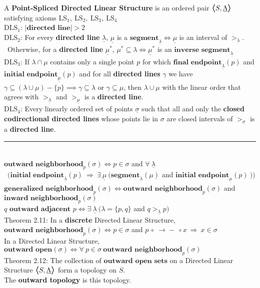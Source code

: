 \documentclass{article}
\newcommand{\hsp}[1][5]{\hspace{0.#1 cm}}
\newcommand{\hcm}[1][1]{\hspace{#1 cm}}
\newcommand{\bra}[1][1.2]{\scalebox{#1}{$\boldsymbol{\langle}$}}
\newcommand{\nl}[1][12]{\\[#1pt]}
\newcommand{\ket}[1][1.2]{\scalebox{#1}{$\boldsymbol{\rangle}$}}
\newcommand{\imp}{\ \Rightarrow\ }
\newcommand{\ch}[1]{\text{#1}}
\newcommand {\chb}[1]{\textbf{#1}}
\newcommand{\rseg}{\!\rightarrow\!\!\!-}
\newcommand{\radj}{\,\circ\!\!\!\:\rseg\!\!\!\!\:\circ}
\newcommand{\ul}[1]{\underline{#1}}
\begin{document}
\begin{flushleft}
A \chb{Point-Spliced Directed Linear Structure} is an ordered pair $\bra S, \ul{\Lambda} \ket$ satisfying axioms $\ch{LS}_1,\ \ch{LS}_2,\ \ch{LS}_3,\ \ch{LS}_4$\nl[10]

$\ch{DLS}_1$: $|\chb{directed line}| > 2$\nl[15]

$\ch{DLS}_2$: For every \chb{directed line} $\ul{\lambda}$, $\ul{\mu}$ is a $\chb{segment}_{\ul{\lambda}} \iff \ul{\mu}$ is an interval of $>_{\ul{\lambda}}$.\\\hcm\  Otherwise, for a \chb{directed line} $\ul{\mu}^*$, $\mu^* \subseteq \lambda \iff \ul{\mu}^*$ is an $\chb{inverse segment}_{\ul{\lambda}}$\nl[15]

$\ch{DLS}_3$: If $\lambda \cap \mu$ contains only a single point $p$ for which $\chb{final endpoint}_{\ul{\lambda}}(p)$ and $\chb{initial endpoint}_{\ul{\mu}}(p)$ and for all \chb{directed lines} $\gamma$ we have {\color{purple} $\gamma \subseteq (\lambda \cup \mu) - \{p\} \implies \gamma \subseteq \lambda$ or $\gamma \subseteq \mu$}, then $\lambda \cup \mu$ with the linear order that agrees with $>_{\ul{\lambda}}$ and $>_{\ul{\mu}}$ is a \chb{directed line}.\nl[15]

$\ch{DLS}_4$: Every linearly ordered set of points $\ul{\sigma}$ such that all and only the \chb{closed codirectional directed lines} whose points lie in $\sigma$ are closed intervals of $>_{\ul{\sigma}}$ is a \chb{directed line}.

\par\noindent\rule{\textwidth}{0.4pt}\nl[8] %

$\chb{outward neighborhood}_p(\sigma) \iff p \in \sigma $ and $\forall\ \ul{\lambda}$\\\hcm\  $\Big(\chb{initial endpoint}_{\ul{\lambda}}(p) \imp \exists\ \ul{\mu}\ \big(\chb{segment}_{\ul{\lambda}}(\mu)$ and $\chb{initial endpoint}_{\ul{\mu}}(p)\ \big)\Big)$\nl[5]

\hsp[2] $\chb{generalized neighborhood}_p(\sigma) \iff \chb{outward neighborhood}_p(\sigma)$ and $\chb{inward neighborhood}_p(\sigma)$\nl[10]

$q \chb{ outward adjacent } p \iff \exists\ \ul{\lambda}\ \Big(\lambda = \{p,q\}$ and $q>_{\ul{\lambda}}p\Big)$\nl[5]
\hcm Theorem 2.11: In a \chb{discrete} Directed Linear Structure, $\chb{outward neighborhood}_p(\sigma) \iff p \in \sigma $ and $p \radj x \imp x \in \sigma$\nl[10]

In a Directed Linear Structure, $\chb{outward open}(\sigma) \iff \forall\ p\in \sigma\ \chb{outward neighborhood}_p(\sigma) $\nl[5]
\hcm Theorem 2.12: The collection of $\chb{outward open sets}$ on a Directed Linear Structure $\bra S, \ul{\Lambda}\ket$ form a topology on $S$.\nl[5]
\hsp[2] The \chb{outward topology} is this topology.\nl[10]


\end{flushleft}
\end{document}
